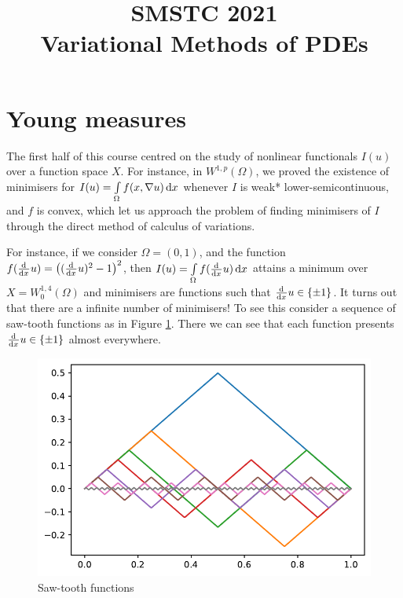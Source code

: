 \documentclass[a4paper,doc,11pt]{article}
\title{\bf
    \Large
    SMSTC 2021 
    \\
    Variational Methods of PDEs
}
\author{}%
\date{}
\begin{document}
\maketitle






\setcounter{section}{5}
\section{Young measures}


The first half of this course centred on the study of nonlinear functionals \(I(u)\) over a function space \(X\). For instance, in \(W^{1,p}(\Omega)\), we proved the existence of minimisers for \(I(u) = \int\limits_\Omega f(x,\nabla u)  \dif x\) whenever \(I\) is weak* lower-semicontinuous, and \(f\) is convex, which let us approach the problem of finding minimisers of \(I\) through the direct method of calculus of variations.

For instance, if we consider \( \Omega = (0,1)\), and the function \(f (\od{ }{x} u) = \big( (\od{ }{x} u)^2 -1 \big)^2\), then \(I(u) = \int\limits_\Omega f (\od{ }{x} u) \dif x\) attains a minimum over \(X = W^{1,4}_0(\Omega)\) and minimisers are functions such that \(\od{ }{x} u \in \{\pm 1\}\). It turns out that there are a infinite number of minimisers! To see this consider a sequence of saw-tooth functions as in Figure \ref{fig:6a}. There we can see that each function presents \(\od{ }{x} u \in \{\pm 1\}\) almost everywhere.

\begin{figure}
    \centering
    \includegraphics[scale=0.75]{Fig-6a.pdf}
    \caption{Saw-tooth functions}
    \label{fig:6a}
\end{figure}
\end{document}
